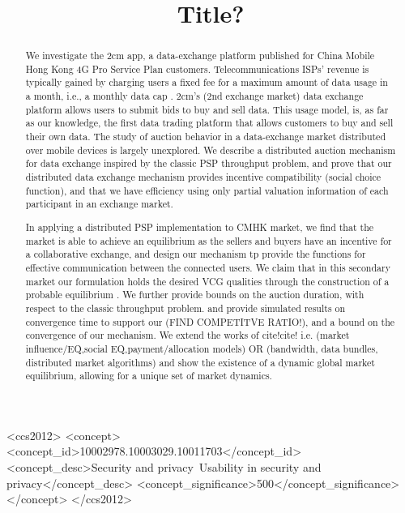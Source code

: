 \documentclass[sigconf, anonymous]{acmart}
\theoremstyle{definition}
\begin{document}
\title{Title?} 

\begin{abstract}
We investigate the 2cm app, a data-exchange platform published for China Mobile Hong
Kong 4G Pro Service Plan customers. Telecommunications ISPs' revenue is typically
gained by charging users a fixed fee for a maximum amount
of data usage in a month, i.e., a monthly data cap \cite{???}. 
2cm's (2nd exchange market) data exchange platform allows users to submit
bids to buy and sell data.
This usage model, is, as far as our knowledge, the first data trading
platform that allows customers to buy and sell their own data. The study of
auction behavior in a data-exchange market distributed over mobile devices is
largely unexplored.
We describe a distributed auction mechanism for data exchange inspired by the
classic PSP throughput problem,
and prove that our distributed data exchange mechanism provides incentive
compatibility (social choice function), and that we have efficiency
using only partial valuation information of each participant in an exchange market.

In applying a distributed PSP implementation to CMHK market, we
find that
the market is able to achieve an equilibrium as the sellers and buyers have an
incentive for a collaborative exchange, and design our mechanism tp provide the functions
for effective communication between the connected users. We claim that in
this secondary market our formulation holds the desired VCG qualities through the construction of a
probable equilibrium \cite{???}. We further provide bounds on the auction duration, 
with respect to the classic throughput problem.
and provide simulated results on convergence time to support our (FIND
COMPETITVE RATIO!), and a bound
on the convergence of our mechanism. We extend the works of cite!cite!
i.e. (market influence/EQ,social EQ,payment/allocation models) OR (bandwidth, data bundles, distributed
market algorithms) and show the existence of a dynamic global market equilibrium, allowing for a unique set of market dynamics.
\end{abstract}

\iffalse
\begin{CCSXML}
<ccs2012>
<concept>
<concept_id>10002978.10003029.10011703</concept_id>
<concept_desc>Security and privacy~Usability in security and privacy</concept_desc>
<concept_significance>500</concept_significance>
</concept>
</ccs2012>
\end{CCSXML}
\end{document}
